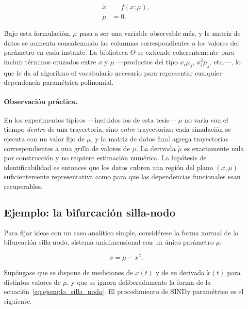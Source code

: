 \begin{equation}
\begin{aligned}
\dot{x} &= f(x; \mu), \\
\dot{\mu} &= 0.
\end{aligned}
\tag{2.3}
\label{eq:sindy_parametrizado}
\end{equation}

Bajo esta formulación, $\mu$ pasa a ser una variable observable más, y la matriz de datos se aumenta concatenando las columnas correspondientes a los valores del parámetro en cada instante. La biblioteca $\Theta$ se extiende coherentemente para incluir términos cruzados entre $x$ y $\mu$ —productos del tipo $x_i\mu_j$, $x_i^2\mu_j$, etc.—, lo que le da al algoritmo el vocabulario necesario para representar cualquier dependencia paramétrica polinomial.

\paragraph{Observación práctica.} En los experimentos típicos —incluidos los de esta tesis— $\mu$ no varía con el tiempo \textit{dentro} de una trayectoria, sino \textit{entre} trayectorias: cada simulación se ejecuta con un valor fijo de $\mu$, y la matriz de datos final agrega trayectorias correspondientes a una grilla de valores de $\mu$. La derivada $\dot{\mu}$ es exactamente nula por construcción y no requiere estimación numérica. La hipótesis de identificabilidad es entonces que los datos cubren una región del plano $(x, \mu)$ suficientemente representativa como para que las dependencias funcionales sean recuperables.

\subsection{Ejemplo: la bifurcación silla-nodo}

Para fijar ideas con un caso analítico simple, considérese la forma normal de la bifurcación silla-nodo, sistema unidimensional con un único parámetro $\mu$:

\begin{equation}
\dot{x} = \mu - x^2.
\tag{2.4}
\label{eq:ejemplo_silla_nodo}
\end{equation}

Supóngase que se dispone de mediciones de $x(t)$ y de su derivada $\dot{x}(t)$ para distintos valores de $\mu$, y que se ignora deliberadamente la forma de la ecuación~\eqref{eq:ejemplo_silla_nodo}. El procedimiento de SINDy paramétrico es el siguiente.

